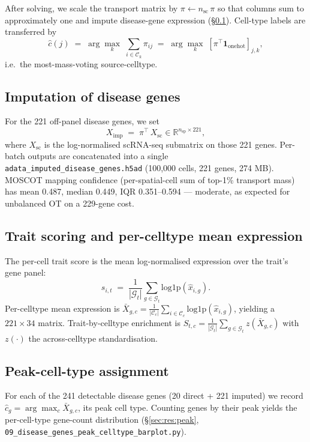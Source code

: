 \documentclass[11pt,a4paper]{article}
\begin{document}
After solving, we scale the transport matrix by $\pi \leftarrow n_{\text{sc}}\,\pi$
so that columns sum to approximately one and impute disease-gene
expression (\S\ref{sec:methods:imputation}). Cell-type labels are
transferred by
\[
\hat{c}(j) \;=\; \arg\max_{k} \;\sum_{i \in \mathcal{C}_k} \pi_{ij}
\;=\; \arg\max_{k} \;[\pi^{\!\top} \mathbf{1}_{\text{onehot}}]_{j,k},
\]
i.e.\ the most-mass-voting source-celltype.

\subsection{Imputation of disease genes}
\label{sec:methods:imputation}
For the 221 off-panel disease genes, we set
\[
X_{\text{imp}} \;=\; \pi^{\!\top}\, X_{\text{sc}}\!\in\! \mathbb{R}^{n_{\text{sp}} \times 221},
\]
where $X_{\text{sc}}$ is the log-normalised scRNA-seq submatrix on those
221 genes. Per-batch outputs are concatenated into a single
\texttt{adata\_imputed\_disease\_genes.h5ad} (100{,}000 cells, 221 genes,
274 MB). MOSCOT mapping confidence (per-spatial-cell sum of top-1\%
transport mass) has mean 0.487, median 0.449, IQR 0.351--0.594 ---
moderate, as expected for unbalanced OT on a 229-gene cost.

\subsection{Trait scoring and per-celltype mean expression}
\label{sec:methods:trait_score}
The per-cell trait score is the mean log-normalised expression over the
trait's gene panel:
\[
s_{i,t} \;=\; \frac{1}{|\mathcal{G}_t|} \sum_{g \in \mathcal{G}_t} \mathrm{log1p}(\hat{x}_{i,g}).
\]
Per-celltype mean expression is
$\bar{X}_{g,c} = \frac{1}{|\mathcal{C}_c|} \sum_{i \in \mathcal{C}_c} \mathrm{log1p}(\hat{x}_{i,g})$,
yielding a $221 \times 34$ matrix. Trait-by-celltype enrichment is
$S_{t,c} = \frac{1}{|\mathcal{G}_t|} \sum_{g \in \mathcal{G}_t} z(\bar{X}_{g,c})$
with $z(\cdot)$ the across-celltype standardisation.

\subsection{Peak-cell-type assignment}
\label{sec:methods:peak}
For each of the 241 detectable disease genes (20 direct + 221 imputed)
we record
$\hat{c}_g = \arg\max_{c} \bar{X}_{g,c}$,
its peak cell type. Counting genes by their peak yields the per-cell-type
gene-count distribution (\S\ref{sec:res:peak},
\texttt{09\_disease\_genes\_peak\_celltype\_barplot.py}).
\end{document}
